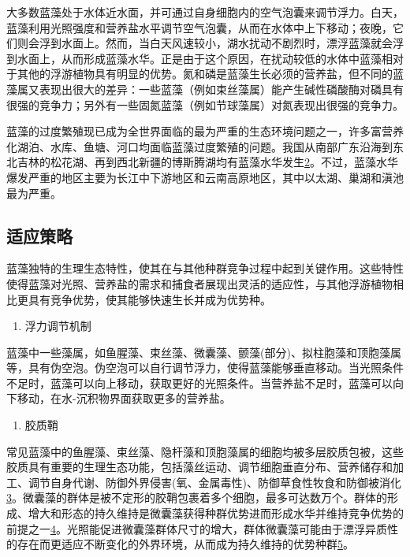 \documentclass[]{book}
\providecommand{\tightlist}{%
  \setlength{\itemsep}{0pt}\setlength{\parskip}{0pt}}
\begin{document}
大多数蓝藻处于水体近水面，并可通过自身细胞内的空气泡囊来调节浮力。白天，蓝藻利用光照强度和营养盐水平调节空气泡囊，从而在水体中上下移动；夜晚，它们则会浮到水面上。然而，当白天风速较小，湖水扰动不剧烈时，漂浮蓝藻就会浮到水面上，从而形成蓝藻水华。正是由于这个原因，在扰动较低的水体中蓝藻相对于其他的浮游植物具有明显的优势。氮和磷是蓝藻生长必须的营养盐，但不同的蓝藻属又表现出很大的差异：一些蓝藻（例如束丝藻属）能产生碱性磷酸酶对磷具有很强的竞争力；另外有一些固氮蓝藻（例如节球藻属）对氮表现出很强的竞争力。

蓝藻的过度繁殖现已成为全世界面临的最为严重的生态环境问题之一，许多富营养化湖泊、水库、鱼塘、河口均面临蓝藻过度繁殖的问题。我国从南部广东沿海到东北吉林的松花湖、再到西北新疆的博斯腾湖均有蓝藻水华发生\href{Kezhen\%20Qian,\%20Ajay\%20Kumar,\%20et.al.\%20Renew.\%20and\%20Sustain.\%20Energy\%20Reviews,\%202015,\%2042:\%201055-1064.}{2}。不过，蓝藻水华爆发严重的地区主要为长江中下游地区和云南高原地区，其中以太湖、巢湖和滇池最为严重。

\hypertarget{ux9002ux5e94ux7b56ux7565}{%
\subsection{适应策略}\label{ux9002ux5e94ux7b56ux7565}}

蓝藻独特的生理生态特性，使其在与其他种群竞争过程中起到关键作用。这些特性使得蓝藻对光照、营养盐的需求和捕食者展现出灵活的适应性，与其他浮游植物相比更具有竞争优势，使其能够快速生长并成为优势种。

\begin{enumerate}
\def\labelenumi{\arabic{enumi}.}
\tightlist
\item
  浮力调节机制
\end{enumerate}

蓝藻中一些藻属，如鱼腥藻、束丝藻、微囊藻、颤藻(部分)、拟柱胞藻和顶胞藻属等，具有伪空泡。伪空泡可以自行调节浮力，使得蓝藻能够垂直移动。当光照条件不足时，蓝藻可以向上移动，获取更好的光照条件。当营养盐不足时，蓝藻可以向下移动，在水-沉积物界面获取更多的营养盐。

\begin{enumerate}
\def\labelenumi{\arabic{enumi}.}
\setcounter{enumi}{1}
\tightlist
\item
  胶质鞘
\end{enumerate}

常见蓝藻中的鱼腥藻、束丝藻、隐杆藻和顶胞藻属的细胞均被多层胶质包被，这些胶质具有重要的生理生态功能，包括藻丝运动、调节细胞垂直分布、营养储存和加工、调节自身代谢、防御外界侵害(氧、金属毒性)、防御草食性牧食和防御被消化\href{Puga\%20A\%20P,\%20Abreu\%20C\%20A,\%20et\%20al.\%20J.\%20of\%20Environ.\%20Manage.,\%202015,\%20159:\%2086–93.}{3}。微囊藻的群体是被不定形的胶鞘包裹着多个细胞，最多可达数万个。群体的形成、增大和形态的持久维持是微囊藻获得种群优势进而形成水华并维持竞争优势的前提之一\href{Khan\%20S,\%20Cai\%20Chao,\%20et\%20al．\%20Environ.\%20Sci.\%20\&\%20Technol.,\%202013,\%2047\%20:\%208624-8632．}{4}。光照能促进微囊藻群体尺寸的增大，群体微囊藻可能由于漂浮异质性的存在而更适应不断变化的外界环境，从而成为持久维持的优势种群\href{Bi\%20H,\%20Huang\%20X,\%20et\%20al.\%20Small\%202014,\%2010,\%203544.}{5}。
\end{document}
